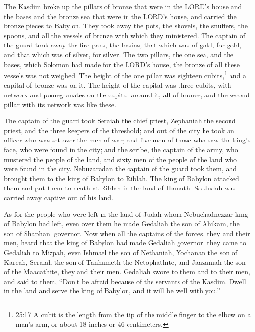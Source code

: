 \myverse{}The Kasdim broke up the pillars of bronze that were in the LORD’s
house and the bases and the bronze sea that were in the LORD’s house, and carried the bronze pieces to
Babylon.
\myverse{}They took away the pots, the shovels, the snuffers, the spoons, and all the
vessels of bronze with which they ministered.
\myverse{}The captain of the guard took away the fire pans, the basins, that which
was of gold, for gold, and that which was of silver, for silver.
\myverse{}The two pillars, the one sea, and the bases, which Solomon had made for the
LORD’s house, the bronze of all these vessels was not weighed.
\myverse{}The height of the one pillar was eighteen cubits,\footnote{25:17 A cubit is the length from the tip of the middle finger to the elbow on a man’s arm, or about
	18 inches or 46 centimeters.} and a capital of bronze was on it. The height of the capital was
three cubits, with network and pomegranates on the capital around it, all of bronze; and the second pillar
with its network was like these.

\myverse{}The captain of the guard took Seraiah the chief priest, Zephaniah
the second priest, and the three keepers of the threshold;
\myverse{}and out of the city he took an officer who was set over the men of war; and
five men of those who saw the king’s face, who were found in the city; and the scribe, the captain of
the army, who mustered the people of the land, and sixty men of the people of the land who were found
in the city.
\myverse{}Nebuzaradan the captain of the guard took them, and brought them to the king
of Babylon to Riblah.
\myverse{}The king of Babylon attacked them and put them to death at Riblah in the
land of Hamath. So Judah was carried away captive out of his land.

\myverse{}As for the people who were left in the land of Judah whom Nebuchadnezzar
king of Babylon had left, even over them he made Gedaliah the son of Ahikam, the son of Shaphan, governor.
\myverse{}Now when all the captains of the forces, they and their men, heard that the
king of Babylon had made Gedaliah governor, they came to Gedaliah to Mizpah, even Ishmael the son of Nethaniah,
Yochanan the son of Kareah, Seraiah the son of Tanhumeth the Netophathite, and Jaazaniah the son of the
Maacathite, they and their men.
\myverse{}Gedaliah swore to them and to their men, and said to them, “Don’t be afraid
because of the servants of the Kasdim. Dwell in the land and serve the king of Babylon, and it will be
well with you.”

